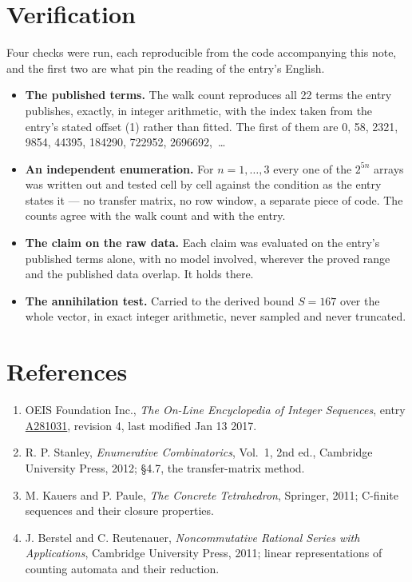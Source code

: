 \documentclass[11pt]{article}
\theoremstyle{definition}
\begin{document}
\section{Verification}

Four checks were run, each reproducible from the code accompanying this note, and the first two are what pin the reading of the entry's English.

\begin{itemize}

\item {\bfseries The published terms.} The walk count reproduces all 22 terms the entry publishes, exactly, in integer arithmetic, with the index taken from the entry's stated offset (1) rather than fitted. The first of them are 0, 58, 2321, 9854, 44395, 184290, 722952, 2696692,~\dots

\item {\bfseries An independent enumeration.} For $n = 1,\dots,3$ every one of the $2^{5n}$ arrays was written out and tested cell by cell against the condition as the entry states it --- no transfer matrix, no row window, a separate piece of code. The counts agree with the walk count and with the entry.

\item {\bfseries The claim on the raw data.} Each claim was evaluated on the entry's published terms alone, with no model involved, wherever the proved range and the published data overlap. It holds there.

\item {\bfseries The annihilation test.} Carried to the derived bound $S = 167$ over the whole vector, in exact integer arithmetic, never sampled and never truncated.

\end{itemize}

\section{References}

\begin{enumerate}

\item OEIS Foundation Inc., \emph{The On-Line Encyclopedia of Integer Sequences}, entry \href{https://oeis.org/A281031}{A281031}, revision 4, last modified Jan 13 2017.

\item R. P. Stanley, \emph{Enumerative Combinatorics}, Vol.~1, 2nd ed., Cambridge University Press, 2012; \S4.7, the transfer-matrix method.

\item M. Kauers and P. Paule, \emph{The Concrete Tetrahedron}, Springer, 2011; C-finite sequences and their closure properties.

\item J. Berstel and C. Reutenauer, \emph{Noncommutative Rational Series with Applications}, Cambridge University Press, 2011; linear representations of counting automata and their reduction.

\end{enumerate}
\end{document}
